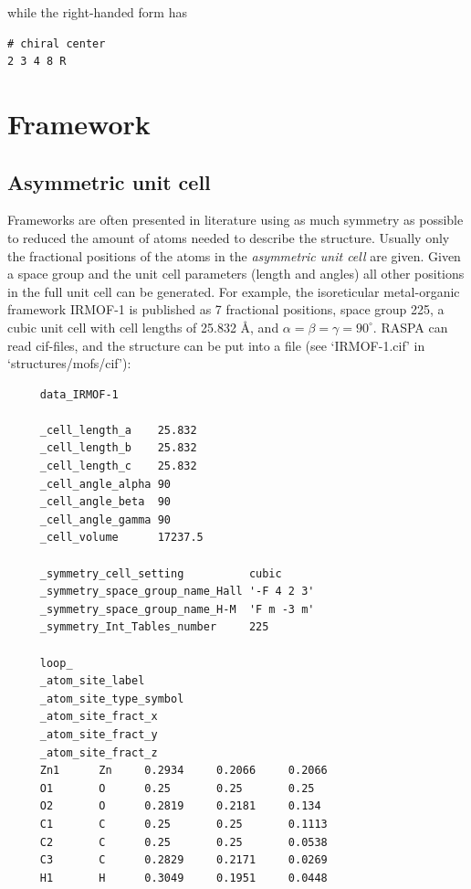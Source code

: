 while the right-handed form has
\begin{tiny}
\begin{verbatim}
# chiral center
2 3 4 8 R
\end{verbatim}
\end{tiny}


\section{Framework}



\subsection{Asymmetric unit cell}

Frameworks are often presented in literature using as much symmetry as possible to reduced the amount of atoms needed to
describe the structure. Usually only the fractional positions of the atoms in the \emph{asymmetric unit cell} are given.
Given a space group and the unit cell parameters (length and angles) all other positions in the full unit cell can be generated.
For example, the isoreticular metal-organic framework IRMOF-1 is published as 7 fractional positions, space group 225,
a cubic unit cell with cell lengths of 25.832 \AA, and $\alpha=\beta=\gamma=90^\circ$. RASPA can read cif-files,
and the structure can be put into a file (see `IRMOF-1.cif' in `structures/mofs/cif'):

\begin{verbatim}
     data_IRMOF-1
     
     _cell_length_a    25.832
     _cell_length_b    25.832
     _cell_length_c    25.832
     _cell_angle_alpha 90
     _cell_angle_beta  90
     _cell_angle_gamma 90
     _cell_volume      17237.5
     
     _symmetry_cell_setting          cubic
     _symmetry_space_group_name_Hall '-F 4 2 3'
     _symmetry_space_group_name_H-M  'F m -3 m'
     _symmetry_Int_Tables_number     225
     
     loop_
     _atom_site_label
     _atom_site_type_symbol
     _atom_site_fract_x
     _atom_site_fract_y
     _atom_site_fract_z
     Zn1      Zn     0.2934     0.2066     0.2066
     O1       O      0.25       0.25       0.25  
     O2       O      0.2819     0.2181     0.134 
     C1       C      0.25       0.25       0.1113
     C2       C      0.25       0.25       0.0538
     C3       C      0.2829     0.2171     0.0269
     H1       H      0.3049     0.1951     0.0448
\end{verbatim}

